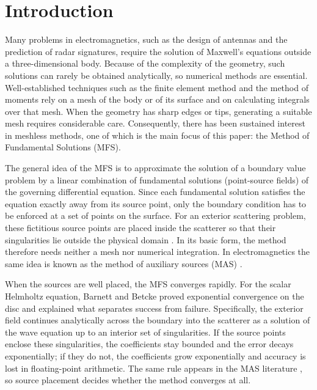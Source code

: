 \section{Introduction}
\label{sec:intro}

Many problems in electromagnetics, such as the design of antennas and the prediction of radar signatures, require the solution of Maxwell's equations outside a three-dimensional body. Because of the complexity of the geometry, such solutions can rarely be obtained analytically, so numerical methods are essential. Well-established techniques such as the finite element method and the method of moments rely on a mesh of the body or of its surface and on calculating integrals over that mesh. When the geometry has sharp edges or tips, generating a suitable mesh requires considerable care. Consequently, there has been sustained interest in meshless methods, one of which is the main focus of this paper: the Method of Fundamental Solutions (MFS).

The general idea of the MFS \cite{kupradze1964,fairweather1998} is to approximate the solution of a boundary value problem by a linear combination of fundamental solutions (point-source fields) of the governing differential equation. Since each fundamental solution satisfies the equation exactly away from its source point, only the boundary condition has to be enforced at a set of points on the surface. For an exterior scattering problem, these fictitious source points are placed inside the scatterer so that their singularities lie outside the physical domain \cite{fairweather2003}. In its basic form, the method therefore needs neither a mesh nor numerical integration. In electromagnetics the same idea is known as the method of auxiliary sources (MAS) \cite{kaklamani2002,doicu2000}.

When the sources are well placed, the MFS converges rapidly. For the scalar Helmholtz equation, Barnett and Betcke \cite{barnett2008} proved exponential convergence on the disc and explained what separates success from failure. Specifically, the exterior field continues analytically across the boundary into the scatterer as a solution of the wave equation up to an interior set of singularities. If the source points enclose these singularities, the coefficients stay bounded and the error decays exponentially; if they do not, the coefficients grow exponentially and accuracy is lost in floating-point arithmetic. The same rule appears in the MAS literature \cite{leviatan1990,zaridze2002,tsitsas2018}, so source placement decides whether the method converges at all.

